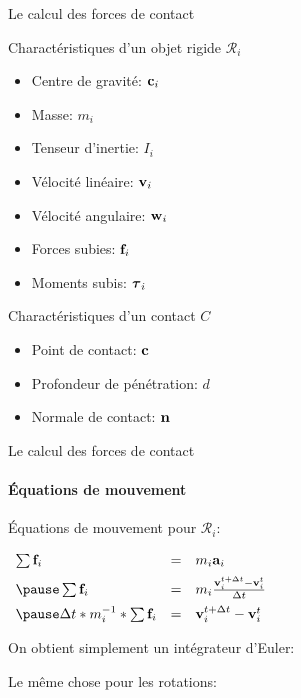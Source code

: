 \begin{frame}{Le calcul des forces de contact}
    \begin{block}{Charactéristiques d’un objet rigide $\mathcal{R}_i$}
    \begin{itemize}
        \item Centre de gravité: ${\bf c}_i$
        \item Masse:             $m_i$
        \item Tenseur d’inertie: $I_i$
        \item Vélocité linéaire: ${\bf v}_i$
        \item Vélocité angulaire: ${\bf w}_i$
        \item Forces subies: ${\bf f}_i$
        \item Moments subis: $\boldsymbol\tau_i$
    \end{itemize}
    \end{block}

    \pause

    \begin{block}{Charactéristiques d’un contact $C$}
    \begin{itemize}
        \item Point de contact: ${\bf c}$
        \item Profondeur de pénétration: $d$
        \item Normale de contact: ${\bf n}$
    \end{itemize}
    \end{block}
\end{frame}

\begin{frame}{Le calcul des forces de contact}
    \framesubtitle{Équations de mouvement}
    Équations de mouvement pour $\mathcal{R}_i$:\\
    \begin{center}
    \begin{math}
        \begin{array}{lcl}
            \sum \f_i & = & m_i\a_i \\[0.5em]
            \pause
            \sum \f_i & = & m_i \frac{\v_i^{t + \Delta t} - \v_i^t}{\Delta t} \\[0.5em]
            \pause
            \Delta t * m_i^{-1} * \sum \f_i & = & \v_i^{t + \Delta t} - \v_i^t
        \end{array}
    \end{math}
    \end{center}

    \pause
    On obtient simplement un intégrateur d’Euler:
    \begin{center}
    \end{center}
    \pause
    Le même chose pour les rotations:
    \begin{center}
    \end{center}
\end{frame}

